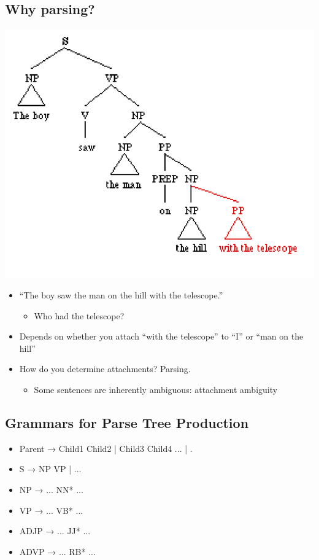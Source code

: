 \documentclass[11pt]{article}
\theoremstyle{definition}
\begin{document}
\subsection{Why parsing?}
\includegraphics[width = \textwidth/2]{2.png}
\begin{itemize}
  \item “The boy saw the man on the hill with
  the telescope.”
  \begin{itemize}
    \item Who had the telescope?
  \end{itemize}
  \item Depends on whether you attach “with the telescope” to “I” or
  “man on the hill”
  \item How do you determine attachments? Parsing.
  \begin{itemize}
    \item Some sentences are inherently ambiguous: attachment ambiguity
  \end{itemize}
\end{itemize}

\subsection{Grammars for Parse Tree Production}
\begin{itemize}
  \item Parent → Child1 Child2 | Child3 Child4 ... | .
  \item S → NP VP | ...
  \item NP → ... NN* ...
  \item VP → ... VB* ...
  \item ADJP → ... JJ* ...
  \item ADVP → ... RB* ...
\end{itemize}
\end{document}
